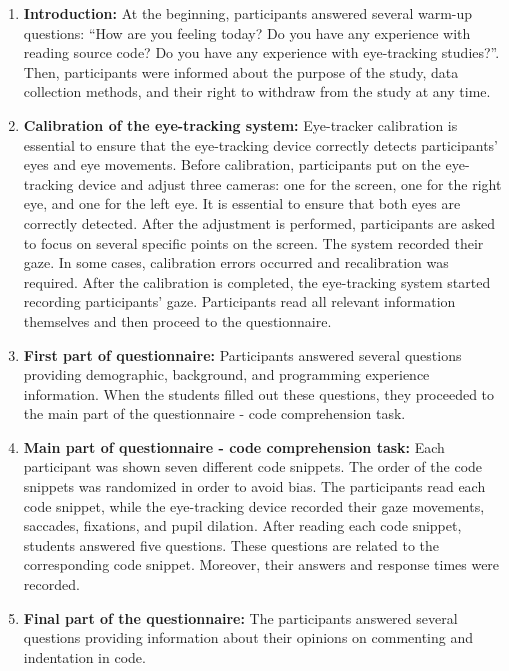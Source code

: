 \begin{enumerate}
    \item \textbf{Introduction:} At the beginning, participants answered several warm-up questions: “How are you feeling today? Do you have any experience with reading source code? Do you have any experience with eye-tracking studies?”. Then, participants were informed about the purpose of the study, data collection methods, and their right to withdraw from the study at any time.

    \item \textbf{Calibration of the eye-tracking system:} 
    Eye-tracker calibration is essential to ensure that the eye-tracking device correctly detects participants’ eyes and eye movements. Before calibration, participants put on the eye-tracking device and adjust three cameras: one for the screen, one for the right eye, and one for the left eye. It is essential to ensure that both eyes are correctly detected. After the adjustment is performed, participants are asked to focus on several specific points on the screen. The system recorded their gaze. In some cases, calibration errors occurred and recalibration was required. After the calibration is completed, the eye-tracking system started recording participants’ gaze. Participants read all relevant information themselves and then proceed to the questionnaire.
    
    \item \textbf{First part of questionnaire:}  
    Participants answered several questions providing demographic, background, and programming experience information. When the students filled out these questions, they proceeded to the main part of the questionnaire - code comprehension task.

    \item \textbf{Main part of questionnaire - code comprehension task:}  Each participant was shown seven different code snippets. The order of the code snippets was randomized in order to avoid bias. The participants read each code snippet, while the eye-tracking device recorded their gaze movements, saccades, fixations, and pupil dilation. After reading each code snippet, students answered five questions. These questions are related to the corresponding code snippet. Moreover, their answers and response times were recorded.

    \item \textbf{Final part of the questionnaire:} 
    The participants answered several questions providing information about their opinions on commenting and indentation in code.


\end{enumerate}
